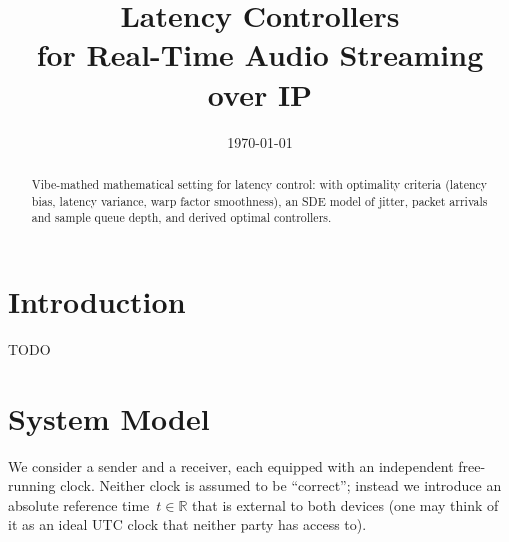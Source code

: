 \documentclass[11pt, a4paper]{article}
\title{%
 Latency Controllers\\
  for Real-Time Audio Streaming over IP%
}
\author{%
}
\date{\today}
\theoremstyle{definition}
\theoremstyle{plain}
\theoremstyle{remark}
\newcommand{\R}{\mathbb{R}}
\begin{document}
\maketitle

\begin{abstract}
  Vibe-mathed mathematical setting for latency control: with optimality criteria
  (latency bias, latency variance, warp factor smoothness), an SDE model of
  jitter, packet arrivals and sample queue depth, and derived optimal controllers.
\end{abstract}

\tableofcontents
\newpage

\section{Introduction}\label{sec:intro}




TODO

\section{System Model}\label{sec:model}

We consider a sender and a receiver, each equipped with an independent
free-running clock.  Neither clock is assumed to be ``correct''; instead
we introduce an absolute reference time~$t \in \R$ that is external to
both devices (one may think of it as an ideal UTC clock that neither
party has access to).

\end{document}
